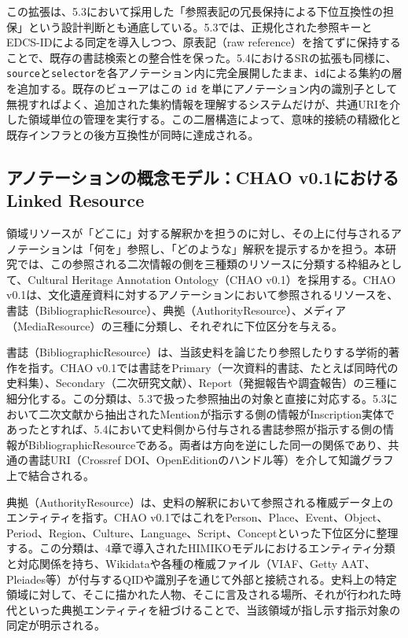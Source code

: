 この拡張は、5.3において採用した「参照表記の冗長保持による下位互換性の担保」という設計判断とも通底している。5.3では、正規化された参照キーとEDCS-IDによる同定を導入しつつ、原表記（raw reference）を捨てずに保持することで、既存の書誌検索との整合性を保った。5.4におけるSRの拡張も同様に、\texttt{source}と\texttt{selector}を各アノテーション内に完全展開したまま、\texttt{id}による集約の層を追加する。既存のビューアはこの \texttt{id} を単にアノテーション内の識別子として無視すればよく、追加された集約情報を理解するシステムだけが、共通URIを介した領域単位の管理を実行する。この二層構造によって、意味的接続の精緻化と既存インフラとの後方互換性が同時に達成される。

\subsection{アノテーションの概念モデル：CHAO v0.1におけるLinked Resource}

領域リソースが「どこに」対する解釈かを担うのに対し、その上に付与されるアノテーションは「何を」参照し、「どのような」解釈を提示するかを担う。本研究では、この参照される二次情報の側を三種類のリソースに分類する枠組みとして、Cultural Heritage Annotation Ontology（CHAO v0.1）を採用する。CHAO v0.1は、文化遺産資料に対するアノテーションにおいて参照されるリソースを、書誌（BibliographicResource）、典拠（AuthorityResource）、メディア（MediaResource）の三種に分類し、それぞれに下位区分を与える。

書誌（BibliographicResource）は、当該史料を論じたり参照したりする学術的著作を指す。CHAO v0.1では書誌をPrimary（一次資料的書誌、たとえば同時代の史料集）、Secondary（二次研究文献）、Report（発掘報告や調査報告）の三種に細分化する。この分類は、5.3で扱った参照抽出の対象と直接に対応する。5.3において二次文献から抽出されたMentionが指示する側の情報がInscription実体であったとすれば、5.4において史料側から付与される書誌参照が指示する側の情報がBibliographicResourceである。両者は方向を逆にした同一の関係であり、共通の書誌URI（Crossref DOI、OpenEditionのハンドル等）を介して知識グラフ上で結合される。

典拠（AuthorityResource）は、史料の解釈において参照される権威データ上のエンティティを指す。CHAO v0.1ではこれをPerson、Place、Event、Object、Period、Region、Culture、Language、Script、Conceptといった下位区分に整理する。この分類は、4章で導入されたHIMIKOモデルにおけるエンティティ分類と対応関係を持ち、Wikidataや各種の権威ファイル（VIAF、Getty AAT、Pleiades等）が付与するQIDや識別子を通じて外部と接続される。史料上の特定領域に対して、そこに描かれた人物、そこに言及される場所、それが行われた時代といった典拠エンティティを紐づけることで、当該領域が指し示す指示対象の同定が明示される。

